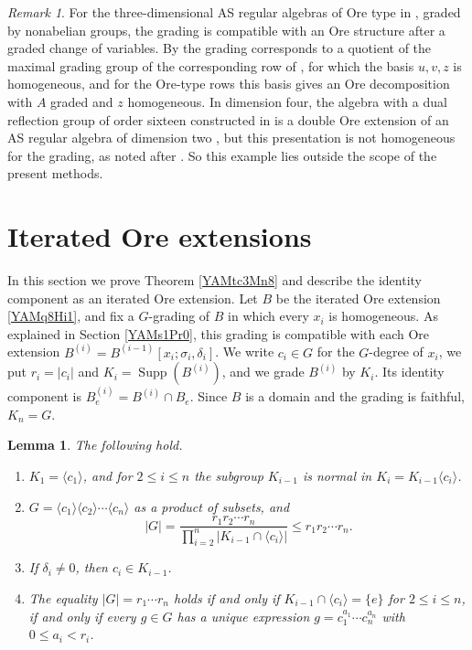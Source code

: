 \documentclass[reqno]{amsart}
\numberwithin{equation}{section}
\newtheorem{lemma}[equation]{Lemma}
\theoremstyle{definition}
\theoremstyle{remark}
\newtheorem{remark}[equation]{Remark}
\theoremstyle{plain}
\DeclareMathOperator{\supp}{Supp}
\begin{document}
\begin{remark}\label{YAMv3Ei8}
For the three-dimensional AS regular algebras of Ore type in \cite[Table 1]{BR}, graded by nonabelian groups, the grading is compatible with an Ore structure after a graded change of variables. By \cite[Theorem 3.4]{BR} the grading corresponds to a quotient of the maximal grading group of the corresponding row of \cite[Table 1]{BR}, for which the basis $u,v,z$ is homogeneous, and for the Ore-type rows this basis gives an Ore decomposition with $A$ graded and $z$ homogeneous. In dimension four, the algebra with a dual reflection group of order sixteen constructed in \cite[\S3.1]{GKMV} is a double Ore extension \cite{ZZ} of an AS regular algebra of dimension two \cite[Proposition 3.1.1]{GKMV}, but this presentation is not homogeneous for the grading, as noted after \cite[Proposition 3.1.1]{GKMV}. So this example lies outside the scope of the present methods.
\end{remark}


\section{Iterated Ore extensions}\label{YAMs5It0}

In this section we prove Theorem \ref{YAMtc3Mn8} and describe the identity component as an iterated Ore extension. Let $B$ be the iterated Ore extension \eqref{YAMq8Hi1}, and fix a $G$-grading of $B$ in which every $x_i$ is homogeneous. As explained in Section \ref{YAMs1Pr0}, this grading is compatible with each Ore extension $B^{(i)}=B^{(i-1)}[x_i;\sigma_i,\delta_i]$. We write $c_i\in G$ for the $G$-degree of $x_i$, we put $r_i=|c_i|$ and $K_i=\supp(B^{(i)})$, and we grade $B^{(i)}$ by $K_i$. Its identity component is $B^{(i)}_e=B^{(i)}\cap B_e$. Since $B$ is a domain and the grading is faithful, $K_n=G$.

\begin{lemma}\label{YAMl6Kn3}
The following hold.
\begin{enumerate}
\item $K_1=\langle c_1\rangle$, and for $2\le i\le n$ the subgroup $K_{i-1}$ is normal in $K_i=K_{i-1}\langle c_i\rangle$.
\item $G=\langle c_1\rangle\langle c_2\rangle\cdots\langle c_n\rangle$ as a product of subsets, and
\[
|G|=\frac{r_1r_2\cdots r_n}{\prod_{i=2}^n|K_{i-1}\cap\langle c_i\rangle|}\le r_1r_2\cdots r_n.
\]
\item If $\delta_i\neq0$, then $c_i\in K_{i-1}$.
\item The equality $|G|=r_1\cdots r_n$ holds if and only if $K_{i-1}\cap\langle c_i\rangle=\{e\}$ for $2\le i\le n$, if and only if every $g\in G$ has a unique expression $g=c_1^{a_1}\cdots c_n^{a_n}$ with $0\le a_i<r_i$.
\end{enumerate}
\end{lemma}
\end{document}
